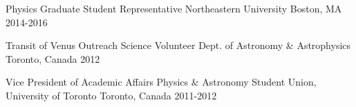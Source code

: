 \begin{cvhonors}
  \cvhonor
    {Physics Graduate Student Representative} %
    {Northeastern University} %
    {Boston, MA} %
    {2014-2016} %
    
    
  \cvhonor
    {Transit of Venus Outreach Science Volunteer} %
    {Dept. of Astronomy \& Astrophysics} %
    {Toronto, Canada} %
    {2012} %
    
  \cvhonor
    {Vice President of Academic Affairs} %
    {Physics \& Astronomy Student Union, University of Toronto} %
    {Toronto, Canada} %
    {2011-2012} %

\end{cvhonors}
